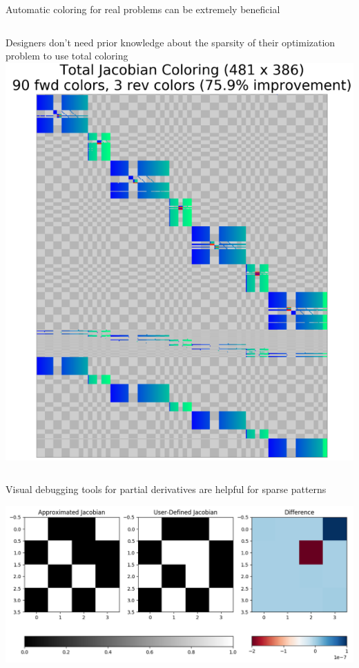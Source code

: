 \documentclass[aspectratio=169, usenames, dvipsnames, 14pt]{beamer}
\begin{document}
\begin{frame}{Automatic coloring for real problems can be extremely beneficial}

	\begin{columns}
			Designers don't need prior knowledge about the sparsity of their optimization problem to use total coloring
			\includegraphics[scale=.37]{images/slide_55_derivatives.png}
	\end{columns}
\end{frame}

\begin{frame}{Visual debugging tools for partial derivatives are helpful for sparse patterns}
	
	\includegraphics[scale=.5]{images/slide_56_derivatives.png}

\end{frame}     
\end{document}
